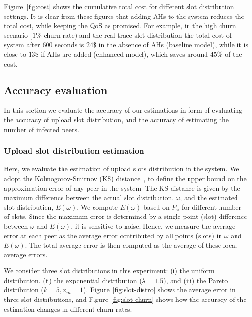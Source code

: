 {Figure~\ref{fig:cost} shows the cumulative total cost for different slot
distribution settings. It is clear from these figures that adding AHs to the
system reduces the total cost, while keeping the QoS as promised. For example,
in the high churn scenario ($1\%$ churn rate) and the real trace slot
distribution the total cost of system after $600$ seconds is $24$\$ in the
absence of AHs (baseline model), while it is close to $13$\$ if AHs are added
(enhanced model), which saves around $45\%$ of the cost.

\subsection{Accuracy evaluation}

In this section we evaluate the accuracy of our estimations in form of
evaluating the accuracy of upload slot distribution, and the accuracy of
estimating the number of infected peers.

\subsubsection{Upload slot distribution estimation}

Here, we evaluate the estimation of upload slots distribution in the system.
We adopt the Kolmogorov-Smirnov (KS) distance~\cite{schay2007introduction}, to
define the upper bound on the approximation error of any peer in the system.
The KS distance is given by the maximum difference between the actual slot
distribution, $\omega$, and the estimated slot distribution, $E(\omega)$. We
compute $E(\omega)$ based on $P_{\omega}$ for different number of slots. Since
the maximum error is determined by a single point (slot) difference between
$\omega$ and $E(\omega)$, it is sensitive to noise. Hence, we measure the
average error at each peer as the average error contributed by all points
(slots) in $\omega$ and $E(\omega)$. The total average error is then computed
as the average of these local average errors.

We consider three slot distributions in this experiment: (i) the uniform
distribution, (ii) the exponential distribution ($\lambda = 1.5$), and (iii)
the Pareto distribution ($k = 5, x_m = 1$). Figure~\ref{fig:slot-distro} shows
the average error in three slot distributions, and Figure~\ref{fig:slot-churn}
shows how the accuracy of the estimation changes in different churn rates.

}
